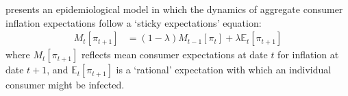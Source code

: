 

\cite{carroll2003macroeconomic} presents an epidemiological model in which the dynamics of aggregate consumer inflation expectations follow a `sticky expectations' equation:
    \begin{align}
        M_{t}[\pi_{t+1}] & = (1-\lambda)M_{t-1}[\pi_{t}]+\lambda \mathbb{E}_{t}[\pi_{t+1}] \label{eq:StickyExp}
    \end{align}
where $M_{t}[\pi_{t+1}]$ reflects mean consumer expectations at date $t$ for inflation at date $t+1$, and $\mathbb{E}_{t}[\pi_{t+1}]$ is a `rational' expectation with which an individual consumer might be infected.



